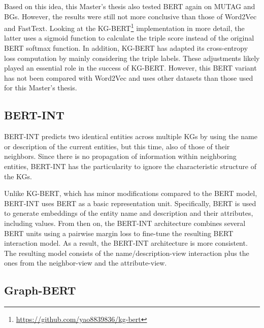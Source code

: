 Based on this idea, this Master's thesis also tested BERT again on MUTAG and
BGs. However, the results were still not more conclusive than those of Word2Vec
and FastText.  Looking at the
KG-BERT\footnote{\url{https://github.com/yao8839836/kg-bert}} implementation in
more detail, the latter uses a sigmoid function to calculate the triple score
instead of the original BERT softmax function. In addition, KG-BERT has adapted
its cross-entropy loss computation by mainly considering the triple
labels. These adjustments likely played an essential role in the success of
KG-BERT. However, this BERT variant has not been compared with Word2Vec and uses
other datasets than those used for this Master's thesis.

\subsection{BERT-INT}
\label{subsec:discussion:bert-int}

BERT-INT predicts two identical entities across multiple KGs by using the name
or description of the current entities, but this time, also of those of their
neighbors. Since there is no propagation of information within neighboring
entities, BERT-INT has the particularity to ignore the characteristic structure
of the KGs.

Unlike KG-BERT, which has minor modifications compared to the BERT model,
BERT-INT uses BERT as a basic representation unit. Specifically, BERT is used to
generate embeddings of the entity name and description and their attributes,
including values. From then on, the BERT-INT architecture combines several BERT
units using a pairwise margin loss to fine-tune the resulting BERT interaction
model. As a result, the BERT-INT architecture is more consistent. The resulting
model consists of the name/description-view interaction plus the ones from the
neighbor-view and the attribute-view.

\subsection{Graph-BERT}
\label{sec:discussion:graph-bert}

